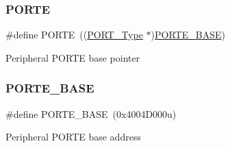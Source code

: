 \subsubsection{\texorpdfstring{PORTE}{PORTE}}
{\footnotesize\ttfamily \#define P\+O\+R\+TE~((\mbox{\hyperlink{struct_p_o_r_t___type}{P\+O\+R\+T\+\_\+\+Type}} $\ast$)\mbox{\hyperlink{group___p_o_r_t___peripheral___access___layer_ga72d490d67d751071845b3532193b4b93}{P\+O\+R\+T\+E\+\_\+\+B\+A\+SE}})}

Peripheral P\+O\+R\+TE base pointer \mbox{\label{group___p_o_r_t___peripheral___access___layer_ga72d490d67d751071845b3532193b4b93}} 
\subsubsection{\texorpdfstring{PORTE\_BASE}{PORTE\_BASE}}
{\footnotesize\ttfamily \#define P\+O\+R\+T\+E\+\_\+\+B\+A\+SE~(0x4004\+D000u)}

Peripheral P\+O\+R\+TE base address 